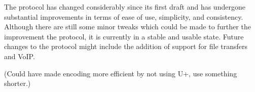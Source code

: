 The protocol has changed considerably since its first draft and has undergone substantial improvements in terms of ease of use, simplicity, and consistency. Although there are still some minor tweaks which could be made to further the improvement the protocol, it is currently in a stable and usable state. Future changes to the protocol might include the addition of support for file transfers and VoIP. %

(Could have made encoding more efficient by not using \SLASH U+, use something shorter.)
